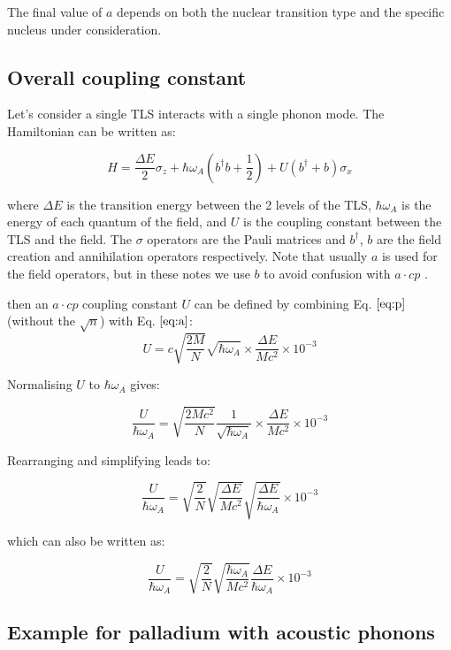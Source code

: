 \documentclass[
]{article}
\renewcommand{\[}{\begin{equation}}
\renewcommand{\]}{\end{equation}}
\begin{document}
The final value of \(a\) depends on both the nuclear transition type and
the specific nucleus under consideration.

\subsection{Overall coupling constant}\label{overall-coupling-constant}

Let's consider a single TLS interacts with a single phonon mode. The
Hamiltonian can be written as:

\[
H = \frac{\Delta E}{2} \sigma_z + \hbar\omega_A\left(b^{\dagger}b +\frac{1}{2}\right) + U\left( b^{\dagger} + b \right)\sigma_x
\]

where \(\Delta E\) is the transition energy between the 2 levels of the
TLS, \(\hbar\omega_A\) is the energy of each quantum of the field, and
\(U\) is the coupling constant between the TLS and the field. The
\(\sigma\) operators are the Pauli matrices and \(b^{\dagger}\), \(b\)
are the field creation and annihilation operators respectively. Note
that usually \(a\) is used for the field operators, but in these notes
we use \(b\) to avoid confusion with \(a \cdot cp\) .

then an \(a \cdot cp\) coupling constant \(U\) can be defined by
combining Eq. \(\ref{eq:p}\) (without the \(\sqrt{n}\)) with Eq.
\(\ref{eq:a}\): \[
U = c \sqrt{\frac{2M}{N}} \sqrt{\hbar \omega_A} \times \frac{\Delta E}{M c^2} \times 10^{-3}
\]

Normalising \(U\) to \(\hbar \omega_A\) gives:

\[
\frac{U}{\hbar \omega_A} = \sqrt{\frac{2M c^2}{N}} \frac{1}{\sqrt{\hbar \omega_A}} \times \frac{\Delta E}{M c^2} \times 10^{-3}
\]

Rearranging and simplifying leads to:

\[
\frac{U}{\hbar \omega_A} = \sqrt{\frac{2}{N}} \sqrt{\frac{\Delta E}{M c^2}} \sqrt{\frac{\Delta E}{\hbar \omega_A}} \times 10^{-3}
\]

which can also be written as:

\[
\frac{U}{\hbar \omega_A} = \sqrt{\frac{2}{N}} \sqrt{\frac{\hbar \omega_A}{M c^2}} \frac{\Delta E}{\hbar \omega_A} \times 10^{-3}
\]

\subsection{Example for palladium with acoustic
phonons}\label{example-for-palladium-with-acoustic-phonons}
\end{document}
